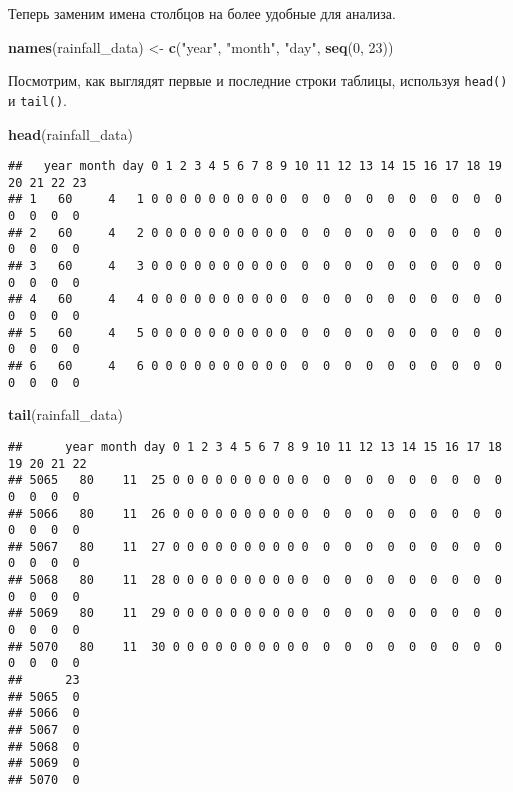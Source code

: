 \documentclass[
]{article}
\newenvironment{Shaded}{\begin{snugshade}}{\end{snugshade}}
\newcommand{\DecValTok}[1]{\textcolor[rgb]{0.00,0.00,0.81}{#1}}
\newcommand{\FunctionTok}[1]{\textcolor[rgb]{0.13,0.29,0.53}{\textbf{#1}}}
\newcommand{\NormalTok}[1]{#1}
\newcommand{\OtherTok}[1]{\textcolor[rgb]{0.56,0.35,0.01}{#1}}
\newcommand{\StringTok}[1]{\textcolor[rgb]{0.31,0.60,0.02}{#1}}
\begin{document}
Теперь заменим имена столбцов на более удобные для анализа.

\begin{Shaded}
\begin{Highlighting}[]
\FunctionTok{names}\NormalTok{(rainfall\_data) }\OtherTok{\textless{}{-}} \FunctionTok{c}\NormalTok{(}\StringTok{"year"}\NormalTok{, }\StringTok{"month"}\NormalTok{, }\StringTok{"day"}\NormalTok{, }\FunctionTok{seq}\NormalTok{(}\DecValTok{0}\NormalTok{, }\DecValTok{23}\NormalTok{))}
\end{Highlighting}
\end{Shaded}

Посмотрим, как выглядят первые и последние строки таблицы, используя
\texttt{head()} и \texttt{tail()}.

\begin{Shaded}
\begin{Highlighting}[]
\FunctionTok{head}\NormalTok{(rainfall\_data)}
\end{Highlighting}
\end{Shaded}

\begin{verbatim}
##   year month day 0 1 2 3 4 5 6 7 8 9 10 11 12 13 14 15 16 17 18 19 20 21 22 23
## 1   60     4   1 0 0 0 0 0 0 0 0 0 0  0  0  0  0  0  0  0  0  0  0  0  0  0  0
## 2   60     4   2 0 0 0 0 0 0 0 0 0 0  0  0  0  0  0  0  0  0  0  0  0  0  0  0
## 3   60     4   3 0 0 0 0 0 0 0 0 0 0  0  0  0  0  0  0  0  0  0  0  0  0  0  0
## 4   60     4   4 0 0 0 0 0 0 0 0 0 0  0  0  0  0  0  0  0  0  0  0  0  0  0  0
## 5   60     4   5 0 0 0 0 0 0 0 0 0 0  0  0  0  0  0  0  0  0  0  0  0  0  0  0
## 6   60     4   6 0 0 0 0 0 0 0 0 0 0  0  0  0  0  0  0  0  0  0  0  0  0  0  0
\end{verbatim}

\begin{Shaded}
\begin{Highlighting}[]
\FunctionTok{tail}\NormalTok{(rainfall\_data)}
\end{Highlighting}
\end{Shaded}

\begin{verbatim}
##      year month day 0 1 2 3 4 5 6 7 8 9 10 11 12 13 14 15 16 17 18 19 20 21 22
## 5065   80    11  25 0 0 0 0 0 0 0 0 0 0  0  0  0  0  0  0  0  0  0  0  0  0  0
## 5066   80    11  26 0 0 0 0 0 0 0 0 0 0  0  0  0  0  0  0  0  0  0  0  0  0  0
## 5067   80    11  27 0 0 0 0 0 0 0 0 0 0  0  0  0  0  0  0  0  0  0  0  0  0  0
## 5068   80    11  28 0 0 0 0 0 0 0 0 0 0  0  0  0  0  0  0  0  0  0  0  0  0  0
## 5069   80    11  29 0 0 0 0 0 0 0 0 0 0  0  0  0  0  0  0  0  0  0  0  0  0  0
## 5070   80    11  30 0 0 0 0 0 0 0 0 0 0  0  0  0  0  0  0  0  0  0  0  0  0  0
##      23
## 5065  0
## 5066  0
## 5067  0
## 5068  0
## 5069  0
## 5070  0
\end{verbatim}
\end{document}
